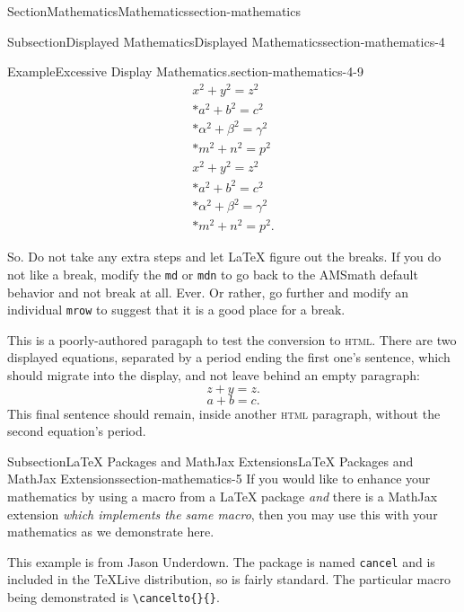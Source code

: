 \documentclass[twoside,10pt,]{article}
\newcommand{\mono}[1]{\texttt{#1}}
\newcommand{\initialism}[1]{\textsc{\MakeLowercase{#1}}}
\numberwithin{equation}{section}
\begin{document}
\begin{sectionptx}{Section}{Mathematics}{}{Mathematics}{}{}{section-mathematics}
\begin{subsectionptx}{Subsection}{Displayed Mathematics}{}{Displayed Mathematics}{}{}{section-mathematics-4}
\begin{example}{Example}{Excessive Display Mathematics.}{section-mathematics-4-9}
\begin{gather}
x^2+y^2=z^2\label{section-mathematics-4-9-3-2-41}\\*
a^2+b^2=c^2\label{section-mathematics-4-9-3-2-42}\\*
\alpha^2+\beta^2=\gamma^2\label{section-mathematics-4-9-3-2-43}\\*
m^2+n^2=p^2\label{section-mathematics-4-9-3-2-44}\\
x^2+y^2=z^2\label{section-mathematics-4-9-3-2-45}\\*
a^2+b^2=c^2\label{section-mathematics-4-9-3-2-46}\\*
\alpha^2+\beta^2=\gamma^2\label{section-mathematics-4-9-3-2-47}\\*
m^2+n^2=p^2\text{.}\label{section-mathematics-4-9-3-2-48}
\end{gather}
%
\par
So.  Do not take any extra steps and let \LaTeX{} figure out the breaks.  If you do not like a break, modify the \mono{md} or \mono{mdn} to go back to the AMSmath default behavior and not break at all.  Ever.  Or rather, go further and modify an individual \mono{mrow} to suggest that it is a good place for a break.%
\end{example}
This is a poorly-authored paragaph to test the conversion to \initialism{HTML}.  There are two displayed equations, separated by a period ending the first one's sentence, which should migrate into the display, and not leave behind an empty paragraph:%
\begin{equation*}
z+y = z\text{.}
\end{equation*}
%
\begin{equation*}
a + b = c\text{.}
\end{equation*}
This final sentence should remain, inside another \initialism{HTML} paragraph, without the second equation's period.%
\end{subsectionptx}
%
%
\typeout{************************************************}
\typeout{************************************************}
%
\begin{subsectionptx}{Subsection}{\LaTeX{} Packages and MathJax Extensions}{}{\LaTeX{} Packages and MathJax Extensions}{}{}{section-mathematics-5}
If you would like to enhance your mathematics by using a macro from a \LaTeX{} package \emph{and} there is a MathJax extension \emph{which implements the same macro}, then you may use this with your mathematics as we demonstrate here.%
\par
This example is from Jason Underdown.  The package is named \mono{cancel} and is included in the TeXLive distribution, so is fairly standard.  The particular macro being demonstrated is \mono{\textbackslash{}cancelto\{\}\{\}}.%

\end{subsectionptx}
\end{sectionptx}
\end{document}
